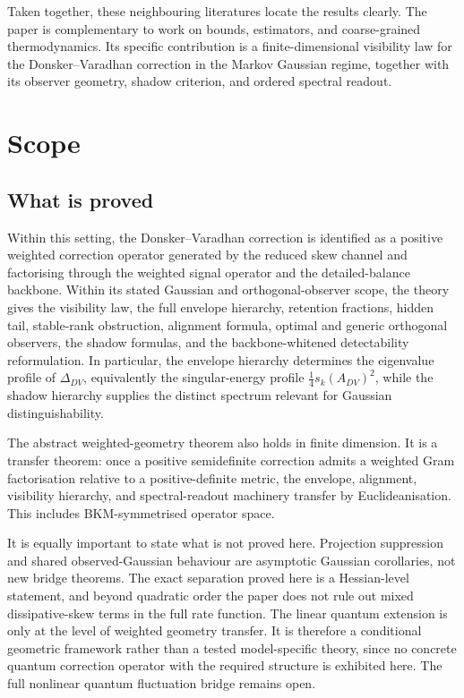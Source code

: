 \documentclass[11pt,a4paper]{article}
\numberwithin{equation}{section}
\theoremstyle{thmcompact}
\theoremstyle{remark}
\begin{document}
Taken together, these neighbouring literatures locate the results clearly. The paper is complementary to work on bounds, estimators, and coarse-grained thermodynamics. Its specific contribution is a finite-dimensional visibility law for the Donsker--Varadhan correction in the Markov Gaussian regime, together with its observer geometry, shadow criterion, and ordered spectral readout.

\section{Scope}
\label{sec:scope-falsifiers-outlook}

\subsection{What is proved}

Within this setting, the Donsker--Varadhan correction is identified as a positive weighted correction operator generated by the reduced skew channel and factorising through the weighted signal operator and the detailed-balance backbone. Within its stated Gaussian and orthogonal-observer scope, the theory gives the visibility law, the full envelope hierarchy, retention fractions, hidden tail, stable-rank obstruction, alignment formula, optimal and generic orthogonal observers, the shadow formulas, and the backbone-whitened detectability reformulation. In particular, the envelope hierarchy determines the eigenvalue profile of \(\Delta_{DV}\), equivalently the singular-energy profile \(\tfrac14 s_k(A_{DV})^2\), while the shadow hierarchy supplies the distinct spectrum relevant for Gaussian distinguishability.

The abstract weighted-geometry theorem also holds in finite dimension. It is a transfer theorem: once a positive semidefinite correction admits a weighted Gram factorisation relative to a positive-definite metric, the envelope, alignment, visibility hierarchy, and spectral-readout machinery transfer by Euclideanisation. This includes BKM-symmetrised operator space.

It is equally important to state what is not proved here. Projection suppression and shared observed-Gaussian behaviour are asymptotic Gaussian corollaries, not new bridge theorems. The exact separation proved here is a Hessian-level statement, and beyond quadratic order the paper does not rule out mixed dissipative-skew terms in the full rate function. The linear quantum extension is only at the level of weighted geometry transfer. It is therefore a conditional geometric framework rather than a tested model-specific theory, since no concrete quantum correction operator with the required structure is exhibited here. The full nonlinear quantum fluctuation bridge remains open.
\end{document}
